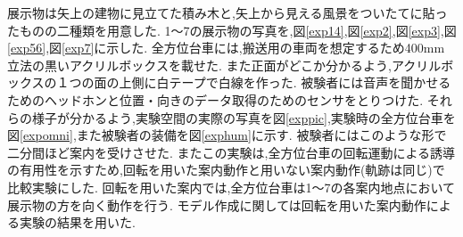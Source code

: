 展示物は矢上の建物に見立てた積み木と,矢上から見える風景をついたてに貼ったものの二種類を用意した.
1～7の展示物の写真を,図\ref{exp14},図\ref{exp2},図\ref{exp3},図\ref{exp56},図\ref{exp7}に示した.
全方位台車には,搬送用の車両を想定するため400mm立法の黒いアクリルボックスを載せた.
また正面がどこか分かるよう,アクリルボックスの１つの面の上側に白テープで白線を作った.
被験者には音声を聞かせるためのヘッドホンと位置・向きのデータ取得のためのセンサをとりつけた.
それらの様子が分かるよう,実験空間の実際の写真を図\ref{exppic},実験時の全方位台車を図\ref{expomni},また被験者の装備を図\ref{exphum}に示す.
被験者にはこのような形で二分間ほど案内を受けさせた.
またこの実験は,全方位台車の回転運動による誘導の有用性を示すため,回転を用いた案内動作と用いない案内動作(軌跡は同じ)で比較実験にした.
回転を用いた案内では,全方位台車は1～7の各案内地点において展示物の方を向く動作を行う.
モデル作成に関しては回転を用いた案内動作による実験の結果を用いた.

\begin{comment}
\begin{figure}[!h]
\begin{center}
\texttt{[image: expmap.eps]}
\caption{実験空間の俯瞰図}
\label{expmap}
\end{center}
\end{figure}
\end{comment}

\begin{comment}
\begin{figure}[htbp]
 \begin{minipage}{0.5\hsize}
\begin{center}
\texttt{[image: exp14.eps]}
\caption{1および4の展示物}
\label{exp14}
\end{center}
 \end{minipage}
 \begin{minipage}{0.5\hsize}
\begin{center}
\texttt{[image: exp2.eps]}
\caption{2の展示物}
\label{exp2}
\end{center}
 \end{minipage}
\end{figure}
\end{comment}

\begin{comment}
\begin{figure}[htbp]
 \begin{minipage}{0.5\hsize}
\begin{center}
\texttt{[image: exp3.eps]}
\caption{3の展示物}
\label{exp3}
\end{center}
 \end{minipage}
 \begin{minipage}{0.5\hsize}
\begin{center}
\texttt{[image: exp56.eps]}
\caption{5および6の展示物}
\label{exp56}
\end{center}
 \end{minipage}
\end{figure}
\end{comment}


